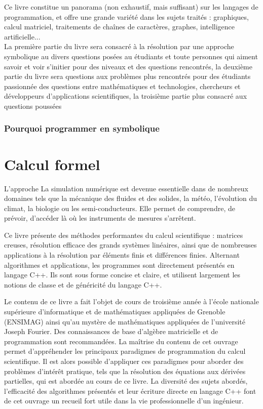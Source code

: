 \documentclass[11pt,fleqn]{book} %
\begin{document}
Ce livre constitue un panorama (non exhaustif, mais suffisant) sur les langages de programmation, et offre une grande variété dans les sujets traités : graphiques, calcul matriciel, traitements de chaînes de caractères, graphes, intelligence artificielle...
\\
La première partie du livre sera consacré \`a la résolution par une approche symbolique au divers questions posées au étudiants et toute personnes qui aiment savoir et voir s'initier  pour des niveaux et des questions rencontrés, la deuxième partie du livre sera questions aux problèmes plus rencontrés pour des étudiants passionnée des questions entre mathématiques et technologies, chercheurs et développeurs d'applications scientifiques, la troisième partie plus consacré aux questions poussées  


\subsection{Pourquoi programmer en symbolique }




\chapter{Calcul formel}

L'approche La simulation numérique est devenue essentielle dans de nombreux domaines tels que la mécanique des fluides et des solides, la météo, l'évolution du climat, la biologie ou les semi-conducteurs. Elle permet de comprendre, de prévoir, d'accéder là où les instruments de mesures s'arrêtent. 

Ce livre présente des méthodes performantes du calcul scientifique : matrices creuses, résolution efficace des grands systèmes linéaires, ainsi que de nombreuses applications à la résolution par éléments finis et différences finies. Alternant algorithmes et applications, les programmes sont directement présentés en langage C++. Ils sont sous forme concise et claire, et utilisent largement les notions de classe et de généricité du langage C++. 

Le contenu de ce livre a fait l'objet de cours de troisième année à l'école nationale supérieure d'informatique et de mathématiques appliquées de Grenoble (ENSIMAG) ainsi qu'au mystère de mathématiques appliquées de l'université Joseph Fourier. Des connaissances de base d'algèbre matricielle et de programmation sont recommandées. La maîtrise du contenu de cet ouvrage permet d'appréhender les principaux paradigmes de programmation du calcul scientifique. Il est alors possible d'appliquer ces paradigmes pour aborder des problèmes d'intérêt pratique, tels que la résolution des équations aux dérivées partielles, qui est abordée au cours de ce livre. La diversité des sujets abordés, l'efficacité des algorithmes présentés et leur écriture directe en langage C++ font de cet ouvrage un recueil fort utile dans la vie professionnelle d'un ingénieur. 
\end{document}
